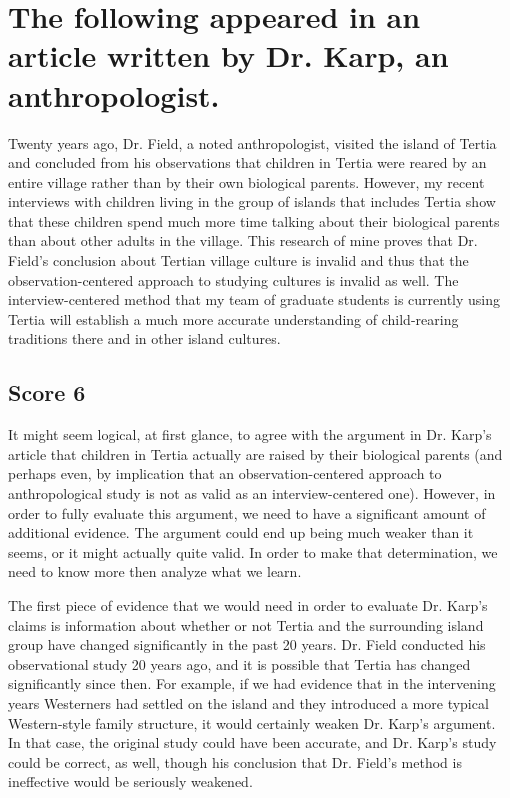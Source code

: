 \chapter{The following appeared in an article written by Dr. Karp, an anthropologist.}

Twenty years ago, Dr. Field, a noted anthropologist, visited the island of Tertia and concluded from his observations that children in Tertia were reared by an entire village rather than by their own biological parents.
However, my recent interviews with children living in the group of islands that includes Tertia show that these children spend much more time talking about their biological parents than about other adults in the village.
This research of mine proves that Dr. Field's conclusion about Tertian village culture is invalid and thus that the observation-centered approach to studying cultures is invalid as well.
The interview-centered method that my team of graduate students is currently using Tertia will establish a much more accurate understanding of child-rearing traditions there and in other island cultures.


\section{Score 6}
It might seem logical, at first glance, to agree with the argument in Dr. Karp's article that children in Tertia actually are raised by their biological parents (and perhaps even, by implication that an observation-centered approach to anthropological study is not as valid as an interview-centered one).
However, in order to fully evaluate this argument, we need to have a significant amount of additional evidence.
The argument could end up being much weaker than it seems, or it might actually quite valid.
In order to make that determination, we need to know more then analyze what we learn.

The first piece of evidence that we would need in order to evaluate Dr. Karp's claims is information about whether or not Tertia and the surrounding island group have changed significantly in the past 20 years.
Dr. Field conducted his observational study 20 years ago, and it is possible that Tertia has changed significantly since then.
For example, if we had evidence that in the intervening years Westerners had settled on the island and they introduced a more typical Western-style family structure, it would certainly weaken Dr. Karp's argument.
In that case, the original study could have been accurate, and Dr. Karp's study could be correct, as well, though his conclusion that Dr. Field's method is ineffective would be seriously weakened.

